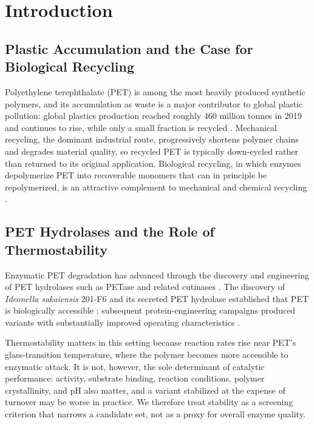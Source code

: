 \documentclass[journal,article,submit,moreauthors]{Definitions/mdpi}
\begin{document}
\section{Introduction}

\subsection{Plastic Accumulation and the Case for Biological Recycling}

Polyethylene terephthalate (PET) is among the most heavily produced synthetic polymers,
and its accumulation as waste is a major contributor to global plastic pollution: global
plastics production reached roughly 460 million tonnes in 2019 and continues to rise,
while only a small fraction is recycled \citep{oecd2022plastics}.
Mechanical recycling, the dominant industrial route, progressively shortens polymer chains
and degrades material quality, so recycled PET is typically down-cycled rather than
returned to its original application. Biological recycling, in which enzymes depolymerize
PET into recoverable monomers that can in principle be repolymerized, is an attractive
complement to mechanical and chemical recycling \citep{yoshida2016}.

\subsection{PET Hydrolases and the Role of Thermostability}

Enzymatic PET degradation has advanced through the discovery and engineering of PET
hydrolases such as PETase and related cutinases
\citep{yoshida2016,tournier2020,lu2022}. The discovery of \textit{Ideonella sakaiensis}
201-F6 and its secreted PET hydrolase established that PET is biologically accessible
\citep{yoshida2016}; subsequent protein-engineering campaigns produced variants with
substantially improved operating characteristics \citep{tournier2020,lu2022}.

Thermostability matters in this setting because reaction rates rise near PET's
glass-transition temperature, where the polymer becomes more accessible to enzymatic
attack. It is not, however, the sole determinant of catalytic performance: activity,
substrate binding, reaction conditions, polymer crystallinity, and pH also matter, and a
variant stabilized at the expense of turnover may be worse in practice. We therefore treat
stability as a screening criterion that narrows a candidate set, not as a proxy for overall
enzyme quality.
\end{document}
